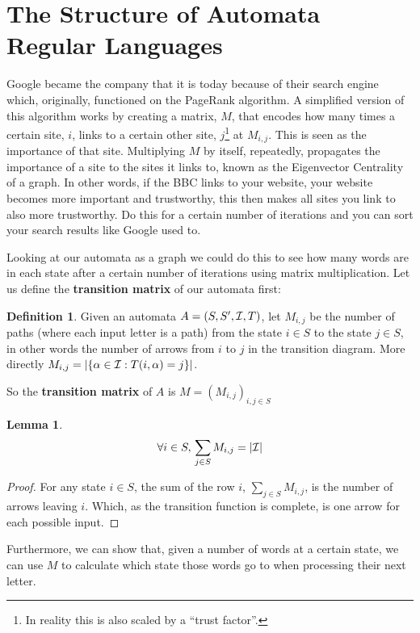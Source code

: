 \documentclass[a4paper]{article}
\newtheorem{lemma}{Lemma}[section]
\theoremstyle{definition}
\newtheorem{definition}{Definition}[section]
\theoremstyle{definition}
\theoremstyle{definition}
\begin{document}
\section{The Structure of Automata Regular Languages}

Google became the company that it is today because of their search engine which, originally, functioned on the PageRank algorithm. A simplified version of this algorithm works by creating a matrix, \(M\), that encodes how many times a certain site, \(i\), links to a certain other site, \(j\)\footnote{In reality this is also scaled by a ``trust factor''.} at \(M_{i, j}\). This is seen as the importance of that site. Multiplying \(M\) by itself, repeatedly, propagates the importance of a site to the sites it links to, known as the Eigenvector Centrality of a graph. In other words, if the BBC links to your website, your website becomes more important and trustworthy, this then makes all sites you link to also more trustworthy. Do this for a certain number of iterations and you can sort your search results like Google used to.

Looking at our automata as a graph we could do this to see how many words are in each state after a certain number of iterations using matrix multiplication. Let us define the \textbf{transition matrix} of our automata first:

\begin{definition}
    Given an automata \(A = (S, S^\prime, \mathcal{I}, T)\), let \(M_{i,j}\) be the number of paths (where each input letter is a path) from the state \(i \in S\) to the state \(j \in S\), in other words the number of arrows from \(i\) to \(j\) in the transition diagram. More directly \(M_{i,j} = |\{ \alpha \in \mathcal{I} : T(i, \alpha) = j \}|\).

    So the \textbf{transition matrix} of \(A\) is \(M = (M_{i,j})_{i,j \in S}\)
\end{definition}

\begin{lemma}
    \[ \forall i \in S,\,\sum_{j \in S} M_{i,j} = |\mathcal{I}| \]
\end{lemma}
\begin{proof}
    For any state \(i \in S\), the sum of the row \(i\), \(\sum_{j \in S} M_{i,j}\), is the number of arrows leaving \(i\). Which, as the transition function is complete, is one arrow for each possible input.
\end{proof}

Furthermore, we can show that, given a number of words at a certain state, we can use \(M\) to calculate which state those words go to when processing their next letter.
\end{document}
